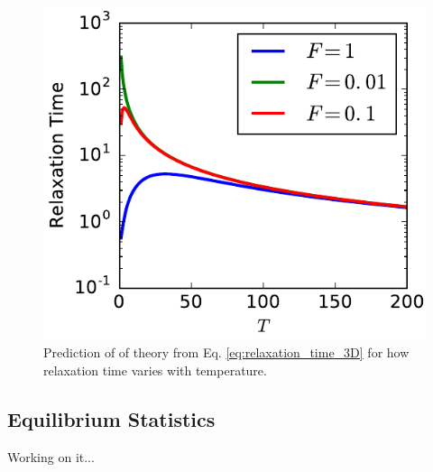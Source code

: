 \documentclass[12pt,a4paper]{article}
\begin{document}
\begin{figure}[htpb]
    \centering
    \includegraphics[width=0.8\linewidth]{prediction.pdf}
    \caption{Prediction of of theory from Eq. \eqref{eq:relaxation_time_3D} for
        how relaxation time varies with temperature.}
    \label{fig:prediction}
\end{figure}

\subsection{Equilibrium Statistics}
\label{sub:equilibrium_statistics}

Working on it...



 

\end{document}
